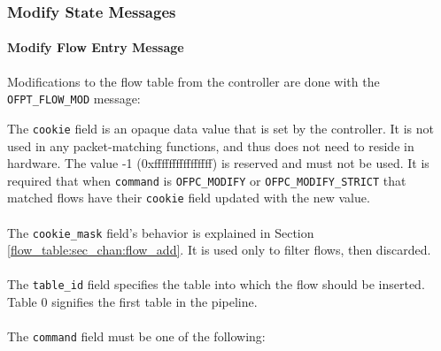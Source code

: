 \subsubsection{Modify State Messages}
\paragraph{Modify Flow Entry Message}
Modifications to the flow table from the controller are done with the \verb|OFPT_FLOW_MOD| message:


The \verb|cookie| field is an opaque data value that is set by the
controller.  It is not used in any packet-matching functions, and thus does
not need to reside in hardware.  The value -1 (0xffffffffffffffff) is
reserved and must not be used.  It is required that when \verb|command| is
\verb|OFPC_MODIFY| or \verb|OFPC_MODIFY_STRICT| that matched flows have
their \verb|cookie| field updated with the new value.
\\\\
The \verb|cookie_mask| field's behavior is explained in Section \ref{flow_table:sec_chan:flow_add}. It is used only to filter flows, then discarded.
\\\\
The \verb|table_id| field specifies the table into which the flow should be inserted.
Table 0 signifies the first table in the pipeline.
\\\\
The \verb|command| field must be one of the following:

